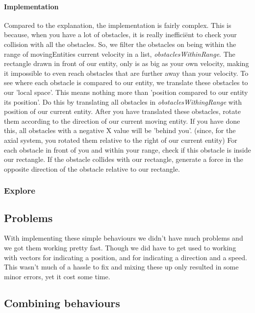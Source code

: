\documentclass[11pt]{extarticle}
\begin{document}
    \paragraph{Implementation}
    Compared to the explanation, the implementation is fairly complex.
    This is because, when you have a lot of obstacles, it is really ineffici\"ent to check your collision with all the obstacles.
    So, we filter the obstacles on being within the range of movingEntities current velocity in a list, \textit{obstaclesWithinRange}.
    The rectangle drawn in front of our entity, only is as big as your own velocity, making it impossible to even reach obstacles that are further away than your velocity.
    To see where each obstacle is compared to our entity, we translate these obstacles to our 'local space'.
    This means nothing more than 'position compared to our entity its position'.
    Do this by translating all obstacles in \textit{obstaclesWithingRange} with position of our current entity.
    After you have translated these obstacles, rotate them according to the direction of our current moving entity.
    If you have done this, all obstacles with a negative X value will be 'behind you'. (since, for the axial system, you rotated them relative to the right of our current entity)
    For each obstacle in front of you and within your range, check if this obstacle is inside our rectangle.
    If the obstacle collides with our rectangle, generate a force in the opposite direction of the obstacle relative to our rectangle.
    
    \subsubsection{Explore}

    \subsection[Problems we had during implementing these behaviours]{Problems}
    With implementing these simple behaviours we didn't have much problems and we got them working pretty fast.
    Though we did have to get used to working with vectors for indicating a position, and for indicating a direction and a speed.
    This wasn't much of a hassle to fix and mixing these up only resulted in some minor errors, yet it cost some time.
    
    
    \subsection[How the steering behaviours are combined]{Combining behaviours}
\end{document}
